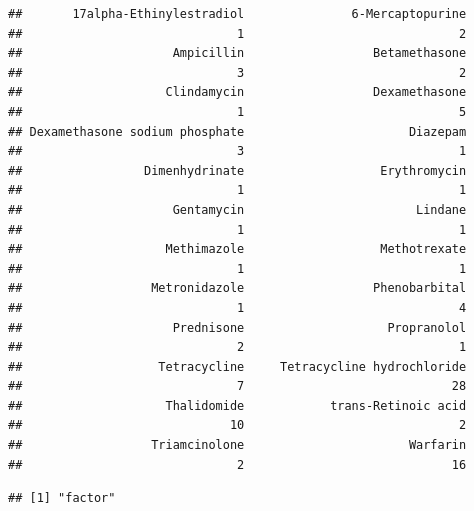 \documentclass[12pt,]{article}
\newenvironment{Shaded}{\begin{snugshade}}{\end{snugshade}}
\newcommand{\KeywordTok}[1]{\textcolor[rgb]{0.13,0.29,0.53}{\textbf{#1}}}
\newcommand{\OperatorTok}[1]{\textcolor[rgb]{0.81,0.36,0.00}{\textbf{#1}}}
\newcommand{\NormalTok}[1]{#1}
\begin{document}
\begin{Shaded}
\end{Shaded}

\begin{verbatim}
##       17alpha-Ethinylestradiol               6-Mercaptopurine 
##                              1                              2 
##                     Ampicillin                  Betamethasone 
##                              3                              2 
##                    Clindamycin                  Dexamethasone 
##                              1                              5 
## Dexamethasone sodium phosphate                       Diazepam 
##                              3                              1 
##                 Dimenhydrinate                   Erythromycin 
##                              1                              1 
##                     Gentamycin                        Lindane 
##                              1                              1 
##                    Methimazole                   Methotrexate 
##                              1                              1 
##                  Metronidazole                  Phenobarbital 
##                              1                              4 
##                     Prednisone                    Propranolol 
##                              2                              1 
##                   Tetracycline     Tetracycline hydrochloride 
##                              7                             28 
##                    Thalidomide            trans-Retinoic acid 
##                             10                              2 
##                  Triamcinolone                       Warfarin 
##                              2                             16
\end{verbatim}

\begin{Shaded}
\end{Shaded}

\begin{verbatim}
## [1] "factor"
\end{verbatim}
\end{document}
